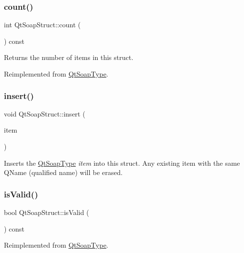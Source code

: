 \subsubsection{\texorpdfstring{count()}{count()}}
{\footnotesize\ttfamily int Qt\+Soap\+Struct\+::count (\begin{DoxyParamCaption}{ }\end{DoxyParamCaption}) const\hspace{0.3cm}{\ttfamily [virtual]}}

Returns the number of items in this struct. 

Reimplemented from \mbox{\hyperlink{class_qt_soap_type_a8d6c4868a786f3b7fd6784a45501e16f}{Qt\+Soap\+Type}}.

\mbox{\label{class_qt_soap_struct_aff72b9260ac8a59e856d1faf58b56f21}} 
\subsubsection{\texorpdfstring{insert()}{insert()}}
{\footnotesize\ttfamily void Qt\+Soap\+Struct\+::insert (\begin{DoxyParamCaption}\item[{\mbox{\hyperlink{class_qt_soap_type}{Qt\+Soap\+Type}} $\ast$}]{item }\end{DoxyParamCaption})}

Inserts the \mbox{\hyperlink{class_qt_soap_type}{Qt\+Soap\+Type}} {\itshape item} into this struct. Any existing item with the same Q\+Name (qualified name) will be erased. \mbox{\label{class_qt_soap_struct_a6331af5d1dc99b8ed528c26a834d961f}} 
\subsubsection{\texorpdfstring{is\+Valid()}{isValid()}}
{\footnotesize\ttfamily bool Qt\+Soap\+Struct\+::is\+Valid (\begin{DoxyParamCaption}{ }\end{DoxyParamCaption}) const\hspace{0.3cm}{\ttfamily [virtual]}}



Reimplemented from \mbox{\hyperlink{class_qt_soap_type_a3b659f89a768ca3503fc86086bb987f6}{Qt\+Soap\+Type}}.

